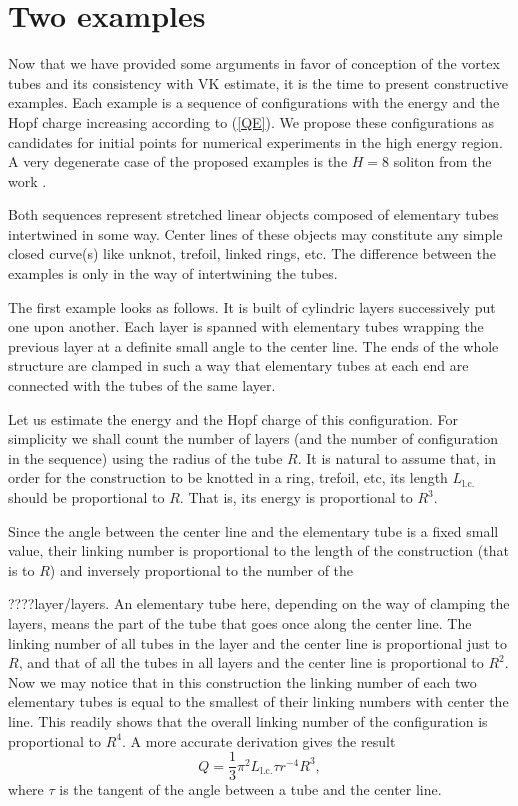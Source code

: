 \documentclass[a4paper,12pt]{article}
\begin{document}
\section{Two examples}
	Now that we have provided some arguments in favor
	of conception of the vortex tubes and its consistency
	with VK estimate, it is the time to present constructive
	examples. Each example is a sequence of configurations
	with the energy and the Hopf charge increasing according to
(\ref{QE}).
	We propose these configurations as candidates for
	initial points for numerical experiments in the high
	energy region.
	A very degenerate case of the proposed examples is the
    $ H=8 $
	soliton from the work
\cite{BS}.
	
	Both sequences represent stretched linear objects composed of
	elementary tubes intertwined in some way. Center lines
	of these objects may constitute any simple closed curve(s)
	like unknot, trefoil, linked rings, etc.
	The difference between the examples is only in the way of
	intertwining the tubes.

	The first example looks as follows.
	It is built of cylindric layers successively put one
	upon another. Each layer is spanned with elementary tubes
	wrapping the previous layer at a definite small angle
	to the center line. The ends of the whole structure
	are clamped in such a way that elementary tubes at each end
	are connected with the tubes of the same layer.

	Let us estimate the energy and the Hopf charge of this configuration.
	For simplicity we shall count the number of layers (and the
	number of configuration in the sequence) using the radius of the tube
    $ R $.
	It is natural to assume that, in order for the construction
	to be knotted in a ring, trefoil, etc, its length 
    $ L_{\text{l.c.}} $
	should be proportional to 
    $ R $.
	That is, its energy is proportional to 
    $ R^{3} $.

	Since the angle between the center line and the elementary
	tube is a fixed small value, their linking number is proportional
	to the length of the construction (that is to 
    $ R $)
	and inversely proportional to the number of the 

????layer/layers.
	An elementary tube here, depending on the way of clamping the
	layers, means the part of the tube that goes once along
	the center line.
	The linking number of all tubes in the layer and the center line
	is proportional just to 
    $ R $,
	and that of all the tubes in all layers and the center line
	is proportional to 
    $ R^{2} $.
	Now we may notice that in this construction the linking number
	of each two elementary tubes is equal to the smallest of their
	linking numbers with center the line.
	This readily shows that the overall linking number of the
	configuration is proportional to 
    $ R^{4} $.
	A more accurate derivation gives the result
\begin{equation}
    Q = \frac{1}{3} \pi^{2} L_{\text{l.c.}} \tau r^{-4} R^{3},
\end{equation}
	where 
    $ \tau $
	is the tangent of the angle between a tube and the center line.
\end{document}
